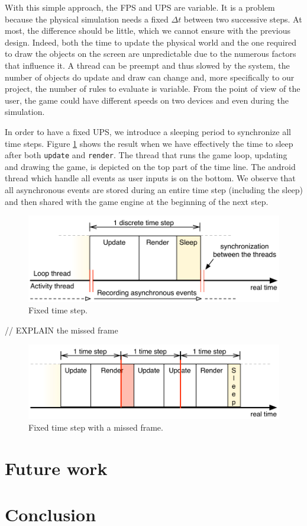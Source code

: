 \documentclass[11pt,a4paper]{article}
\begin{document}
With this simple approach, the FPS and UPS are variable. It is a problem because the physical simulation needs a fixed $\Delta t$ between two successive steps. At most, the difference should be little, which we cannot ensure with the previous design. Indeed, both the time to update the physical world and the one required to draw the objects on the screen are unpredictable due to the numerous factors that influence it. A thread can be preempt and thus slowed by the system, the number of objects do update and draw can change and, more specifically to our project, the number of rules to evaluate is variable. From the point of view of the user, the game could have different speeds on two devices and even during the simulation.

In order to have a fixed UPS, we introduce a sleeping period to synchronize all time steps. Figure \ref{fig:fixedTimeStep} shows the result when we have effectively the time to sleep after both \texttt{update} and \texttt{render}. The thread that runs the game loop, updating and drawing the game, is depicted on the top part of the time line. The android thread which handle all events as user inputs is on the bottom. We observe that all asynchronous events are stored during an entire time step (including the sleep) and then shared with the game engine at the beginning of the next step.

\begin{figure}[h]
\centering
\includegraphics[scale = 0.8]{images/fixedTimeStep} 
\caption{Fixed time step.}
\label{fig:fixedTimeStep}
\end{figure}


// EXPLAIN the missed frame


\begin{figure}[h]
\centering
\includegraphics[scale = 0.8]{images/missFrame} 
\caption{Fixed time step with a missed frame.}
\label{fig:missFrame}
\end{figure}

\section{Future work}


\section{Conclusion}
\end{document}
